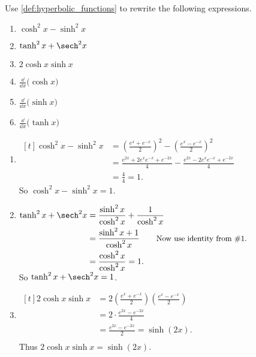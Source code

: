 \begin{example}\label{ex_hf1}
Use \autoref{def:hyperbolic_functions} to rewrite the following expressions.
\begin{multicols}{2}
\begin{enumerate}
\item		$\cosh^2 x-\sinh^2x$
\item		$\tanh^2 x+\sech^2 x$
\item		$2\cosh x\sinh x$
\item		$\frac{\dd}{\dd x}\bigl(\cosh x\bigr)$
\item		$\frac{\dd}{\dd x}\bigl(\sinh x\bigr)$
\item		$\frac{\dd}{\dd x}\bigl(\tanh x\bigr)$
\end{enumerate}
\end{multicols}
\solution
\begin{enumerate}
\item \hfill$\begin{aligned}[t]
 \cosh^2x-\sinh^2x
 &= \left(\frac{e^x+e^{-x}}2\right)^2 -\left(\frac{e^x-e^{-x}}2\right)^2\\
 &= \frac{e^{2x}+2e^xe^{-x} + e^{-2x}}4 - \frac{e^{2x}-2e^xe^{-x} + e^{-2x}}4\\
 &= \frac44=1.
\end{aligned}$\hfill\null\\
So $\cosh^2 x-\sinh^2x=1$.

\item \hfill$\begin{aligned}[t]
 \tanh^2 x+\sech^2 x
 &=\frac{\sinh^2x}{\cosh^2 x} + \frac{1}{\cosh^2 x} \\
 &= \frac{\sinh^2x+1}{\cosh^2 x}\qquad \text{\small Now use identity from \#1.}\\
 &= \frac{\cosh^2 x}{\cosh^2 x} = 1.
\end{aligned}$\hfill\null\\
So $\tanh^2 x+\sech^2 x=1$.

\item \hfill$\begin{aligned}[t]
	2\cosh x\sinh x
	&= 2\left(\frac{e^x+e^{-x}}2\right)\left(\frac{e^x-e^{-x}}2\right) \\
	&= 2 \cdot\frac{e^{2x} - e^{-2x}}4\\
	&= \frac{e^{2x} - e^{-2x}}2 = \sinh (2x).\\
\end{aligned}$\hfill\null\\
Thus $2\cosh x\sinh x = \sinh (2x)$.


\end{enumerate}
\end{example}
